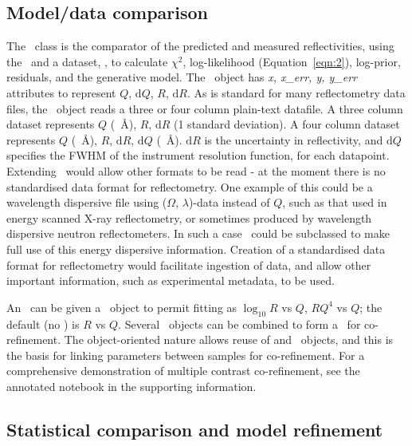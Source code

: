 \documentclass[pdf,preprint]{article}
\begin{document}
\subsection{Model/data comparison}
The \Objective\ class is the comparator of the predicted and measured reflectivities, using the \ReflectModel\ and a dataset, \DataD, to calculate $\chi^2$, log-likelihood (Equation~\ref{eqn:2}), log-prior, residuals, and the generative model.
The \DataD\ object has \emph{x, x\_err, y, y\_err} attributes to represent $Q$, $\mathrm{d}Q$, $R$, $\mathrm{d}R$. As is standard for many reflectometry data files, the \DataD\ object reads a three or four column plain-text datafile. A three column dataset represents $Q$ (\si{\per\angstrom}), $R$, $\mathrm{d}R$ (1 standard deviation). A four column dataset represents $Q$ (\si{\per\angstrom}), $R$, $\mathrm{d}R$, $\mathrm{d}Q$ (\si{\per\angstrom}).
$\mathrm{d}R$ is the uncertainty in reflectivity, and $\mathrm{d}Q$ specifies the FWHM of the instrument resolution function, for each datapoint.
Extending \DataD\ would allow other formats to be read - at the moment there is no standardised data format for reflectometry.  One example of this could be a wavelength dispersive file using ($\Omega$, $\lambda$)-data instead of $Q$, such as that used in energy scanned X-ray reflectometry, or sometimes produced by wavelength dispersive neutron reflectometers. In such a case \ReflectModel\ could be subclassed to make full use of this energy dispersive information.
Creation of a standardised data format for reflectometry would facilitate ingestion of data, and allow other important information, such as experimental metadata, to be used.

An \Objective\ can be given a \Transform\ object to permit fitting as $\log_{10} R$ vs $Q$, $RQ^4$ vs $Q$; the default (no \Transform) is $R$ vs $Q$. Several \Objective\ objects can be combined to form a \GlobalObjective\ for co-refinement. The object-oriented nature allows reuse of \Parameter and \Component\ objects, and this is the basis for linking parameters between samples for co-refinement. For a comprehensive demonstration of multiple contrast co-refinement, see the annotated notebook in the supporting information.

\subsection{Statistical comparison and model refinement}
\end{document}
